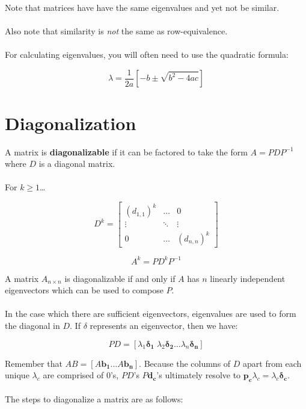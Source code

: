 \documentclass[12pt]{article}
\newcommand{\bt}[1]{\textbf{{#1}}}
\newcommand{\bm}[1]{\mathbf{{#1}}}
\newcommand{\mb}{\begin{bmatrix}}
\newcommand{\me}{\end{bmatrix}}
\begin{document}
Note that matrices have have the same eigenvalues and yet not be similar. \\ \\

Also note that similarity is \emph{not} the same as row-equivalence. \\ \\

For calculating eigenvalues, you will often need to use the quadratic formula:

$$\lambda = \frac{1}{2a}[-b \pm \sqrt{b^2 - 4ac}]$$

\section*{Diagonalization}

A matrix is \bt{diagonalizable} if it can be factored to take the form
$A = PDP^{-1}$ where $D$ is a diagonal matrix. \\ \\

For $k \geq 1$\dots

$$D^k = \mb (d_{1,1})^{k} & \dots & 0 \\ 
\vdots & \ddots & \vdots \\ 
0 & \dots & (d_{n,n})^k \me$$

$$A^k = PD^k P^{-1}$$

A matrix $A_{n \times n}$ is diagonalizable if and only if $A$ has $n$
linearly independent eigenvectors which can be used to compose $P$. \\ \\

In the case which there are sufficient eigenvectors, eigenvalues are used
to form the diagonal in $D$. If $\delta$ represents an eigenvector,
then we have:

$$PD = [\lambda_1 \bm{\delta_1} \; \lambda_2 \bm{\delta_2} \dots \lambda_n \bm{\delta_n}]$$

Remember that $AB = [A\bm{b_1} \dots A\bm{b_n}]$. Because the columns
of $D$ apart from each unique $\lambda_c$ are comprised of $0$'s, $PD$'s
$P\bm{d_c}$'s ultimately resolve to $\bm{p_c} \lambda_c = \lambda_c \bm{\delta_c}$. \\ \\

The steps to diagonalize a matrix are as follows:
\end{document}
